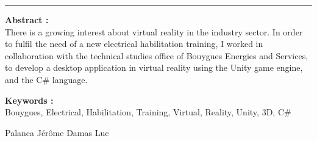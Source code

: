 \documentclass[a4paper]{article}
\begin{document}
    \noindent\rule{0.725\paperwidth}{0.4pt}
    
    \vfill 
    \begin{flushleft}
    \huge \textbf{Abstract : } \\
    \vspace{10pt}
    \normalsize There is a growing interest about virtual reality in the industry sector. In order to fulfil the need of a new electrical habilitation training, I worked in collaboration with the technical studies office of Bouygues Energies and Services, to develop a desktop application in virtual reality using the Unity game engine, and the C\# language.
    \end{flushleft}
    
    \vfill 
    \begin{flushleft}
    \huge \textbf{Keywords : } \\
    \vspace{10pt}
    \normalsize Bouygues, Electrical, Habilitation, Training, Virtual, Reality, Unity, 3D, C\#
    \end{flushleft}

	\vfill
    Palanca Jérôme \hfill Damas Luc
\end{document}
